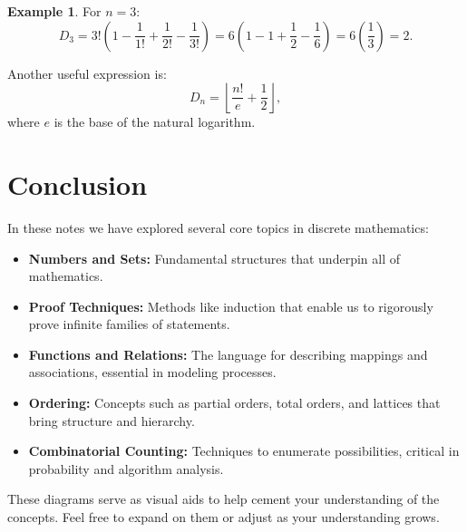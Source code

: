\documentclass[12pt]{article}
\theoremstyle{definition}
\newtheorem{example}[theorem]{Example}
\begin{document}
\begin{example}
  For \(n=3\):
  \[
  D_3 = 3! \left(1 - \frac{1}{1!} + \frac{1}{2!} - \frac{1}{3!}\right)
  = 6\left(1 - 1 + \frac{1}{2} - \frac{1}{6}\right)
  = 6\left(\frac{1}{3}\right)
  = 2.
  \]
\end{example}

Another useful expression is:
\[
D_n = \left\lfloor \frac{n!}{e} + \frac{1}{2} \right\rfloor,
\]
where \(e\) is the base of the natural logarithm.

\section*{Conclusion}

In these notes we have explored several core topics in discrete mathematics:
\begin{itemize}
  \item \textbf{Numbers and Sets:} Fundamental structures that underpin all of mathematics.
  \item \textbf{Proof Techniques:} Methods like induction that enable us to rigorously prove infinite families of statements.
  \item \textbf{Functions and Relations:} The language for describing mappings and associations, essential in modeling processes.
  \item \textbf{Ordering:} Concepts such as partial orders, total orders, and lattices that bring structure and hierarchy.
  \item \textbf{Combinatorial Counting:} Techniques to enumerate possibilities, critical in probability and algorithm analysis.
\end{itemize}

These diagrams serve as visual aids to help cement your understanding of the concepts. Feel free to expand on them or adjust as your understanding grows.
\end{document}
